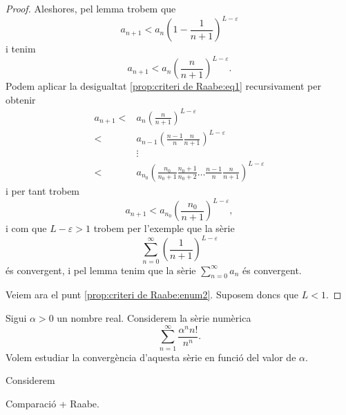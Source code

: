 \documentclass[../Apunts.tex]{subfiles}
\begin{document}
\begin{proposition}
\begin{proof}
			Aleshores, pel lemma  trobem que
			\[a_{n+1}<a_{n}\left(1-\frac{1}{n+1}\right)^{L-\varepsilon}\]
			i tenim
			\begin{equation}
				\label{prop:criteri de Raabe:eq1}
				a_{n+1}<a_{n}\left(\frac{n}{n+1}\right)^{L-\varepsilon}.
			\end{equation}
			Podem aplicar la desigualtat \eqref{prop:criteri de Raabe:eq1} recursivament per obtenir
			\begin{align*}
				a_{n+1}<&a_{n}\left(\frac{n}{n+1}\right)^{L-\varepsilon}\\
				<&a_{n-1}\left(\frac{n-1}{n}\frac{n}{n+1}\right)^{L-\varepsilon}\\
				&\vdots\\
				<&a_{n_{0}}\left(\frac{n_{0}}{n_{0}+1}\frac{n_{0}+1}{n_{0}+2}\dots\frac{n-1}{n}\frac{n}{n+1}\right)^{L-\varepsilon}
			\end{align*}
			i per tant trobem
			\[a_{n+1}<a_{n_{0}}\left(\frac{n_{0}}{n+1}\right)^{L-\varepsilon},\]
			i com que \(L-\varepsilon>1\) trobem per l'exemple  que la sèrie
			\[\sum_{n=0}^{\infty}\left(\frac{1}{n+1}\right)^{L-\varepsilon}\]
			és convergent, i pel lemma  tenim que la sèrie \(\sum_{n=0}^{\infty}a_{n}\) és convergent.
			
			Veiem ara el punt \eqref{prop:criteri de Raabe:enum2}. Suposem doncs que \(L<1\).
		\end{proof}
	\end{proposition}
	\begin{example}
		Sigui \(\alpha>0\) un nombre real. Considerem la sèrie numèrica
		\[\sum_{n=1}^{\infty}\frac{\alpha^{n}n!}{n^{n}}.\]
		Volem estudiar la convergència d'aquesta sèrie en funció del valor de \(\alpha\).
		\begin{solution}
			Considerem
			
			Comparació + Raabe.
		\end{solution}
	\end{example}
\end{document}
